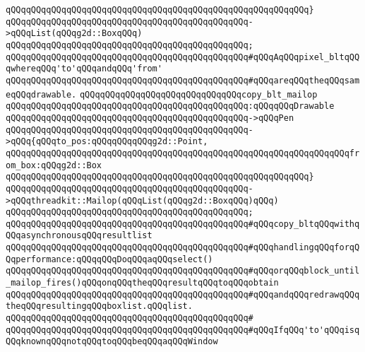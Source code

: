 \verb|qQQqqQQqqQQqqQQqqQQqqQQqqQQqqQQqqQQqqQQqqQQqqQQqqQQqqQQqqQQq}|\newline
\verb|qQQqqQQqqQQqqQQqqQQqqQQqqQQqqQQqqQQqqQQqqQQqqQQq->qQQqList(qQQqg2d::BoxqQQq)|\newline
\verb|qQQqqQQqqQQqqQQqqQQqqQQqqQQqqQQqqQQqqQQqqQQqqQQq;|\newline
\verb|qQQqqQQqqQQqqQQqqQQqqQQqqQQqqQQqqQQqqQQqqQQqqQQq#qQQqAqQQqpixel_bltqQQqwhereqQQq'to'qQQqandqQQq'from'|\newline
\verb|qQQqqQQqqQQqqQQqqQQqqQQqqQQqqQQqqQQqqQQqqQQqqQQq#qQQqareqQQqtheqQQqsameqQQqdrawable.|\newline
\newline
\verb|qQQqqQQqqQQqqQQqqQQqqQQqqQQqqQQqcopy_blt_mailop|\newline
\verb|qQQqqQQqqQQqqQQqqQQqqQQqqQQqqQQqqQQqqQQqqQQqqQQq:qQQqqQQqDrawable|\newline
\verb|qQQqqQQqqQQqqQQqqQQqqQQqqQQqqQQqqQQqqQQqqQQqqQQq->qQQqPen|\newline
\verb|qQQqqQQqqQQqqQQqqQQqqQQqqQQqqQQqqQQqqQQqqQQqqQQq->qQQq{qQQqto_pos:qQQqqQQqqQQqg2d::Point,|\newline
\verb|qQQqqQQqqQQqqQQqqQQqqQQqqQQqqQQqqQQqqQQqqQQqqQQqqQQqqQQqqQQqqQQqqQQqfrom_box:qQQqg2d::Box|\newline
\verb|qQQqqQQqqQQqqQQqqQQqqQQqqQQqqQQqqQQqqQQqqQQqqQQqqQQqqQQqqQQq}|\newline
\verb|qQQqqQQqqQQqqQQqqQQqqQQqqQQqqQQqqQQqqQQqqQQqqQQq->qQQqthreadkit::Mailop(qQQqList(qQQqg2d::BoxqQQq)qQQq)|\newline
\verb|qQQqqQQqqQQqqQQqqQQqqQQqqQQqqQQqqQQqqQQqqQQqqQQq;|\newline
\verb|qQQqqQQqqQQqqQQqqQQqqQQqqQQqqQQqqQQqqQQqqQQqqQQq#qQQqcopy_bltqQQqwithqQQqasynchronousqQQqresultlist|\newline
\verb|qQQqqQQqqQQqqQQqqQQqqQQqqQQqqQQqqQQqqQQqqQQqqQQq#qQQqhandlingqQQqforqQQqperformance:qQQqqQQqDoqQQqaqQQqselect()|\newline
\verb|qQQqqQQqqQQqqQQqqQQqqQQqqQQqqQQqqQQqqQQqqQQqqQQq#qQQqorqQQqblock_until_mailop_fires()qQQqonqQQqtheqQQqresultqQQqtoqQQqobtain|\newline
\verb|qQQqqQQqqQQqqQQqqQQqqQQqqQQqqQQqqQQqqQQqqQQqqQQq#qQQqandqQQqredrawqQQqtheqQQqresultingqQQqboxlist.qQQqlist.|\newline
\verb|qQQqqQQqqQQqqQQqqQQqqQQqqQQqqQQqqQQqqQQqqQQqqQQq#|\newline
\verb|qQQqqQQqqQQqqQQqqQQqqQQqqQQqqQQqqQQqqQQqqQQqqQQq#qQQqIfqQQq'to'qQQqisqQQqknownqQQqnotqQQqtoqQQqbeqQQqaqQQqWindow|\newline
